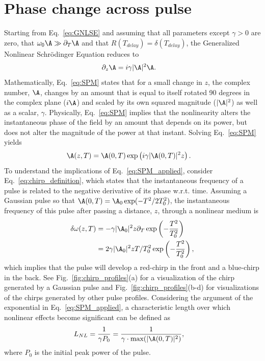 \section{Phase change across pulse}
Starting from Eq.~\ref{eq:GNLSE} and assuming that all parameters except $\gamma>0$ are zero, that $\omega_0\A\gg\partial_T\A$ and that $R(T_{delay})=\delta(T_{delay})$, the Generalized Nonlinear Schr{\"o}dinger Equation reduces to
\begin{align}
\label{eq:SPM}
    \partial_z\A &= i\gamma|\A|^2\A.
\end{align}
Mathematically, Eq.~\ref{eq:SPM} states that for a small change in $z$, the complex number, $\A$, changes by an amount that is equal to itself rotated 90 degrees in the complex plane ($i\A$) and scaled by its own squared magnitude ($|\A|^2$) as well as a scalar, $\gamma$. Physically, Eq.~\ref{eq:SPM} implies that the nonlinearity alters the instantaneous phase of the field by an amount that depends on its power, but does not alter the magnitude of the power at that instant. Solving Eq.~\ref{eq:SPM} yields
\begin{align}
    \label{eq:SPM_applied}
    \A(z,T)&= \A(0,T)\exp\left( i\gamma|\A(0,T)|^2z \right).
\end{align}
To understand the implications of Eq.~\ref{eq:SPM_applied}, consider Eq.~\ref{eq:chirp_definition}, which states that the instantaneous frequency of a pulse is related to the negative derivative of its phase w.r.t. time.  Assuming a Gaussian pulse so that $\A(0,T)=\A_0\exp(-T^2/2T_0^2)$, the instantaneous frequency of this pulse after passing a distance, $z$, through a nonlinear medium is
\begin{align}
\label{eq:SPM_example}
    \delta\omega(z,T) &= -\gamma |\A_0|^2 z\partial_T \exp\left(-\frac{T^2}{T_0^2}\right)\\ \nonumber
    &= 2\gamma |\A_0|^2 z T/T_0^2 \exp\left(-\frac{T^2}{T_0^2}\right),
\end{align}
which implies that the pulse will develop a red-chirp in the front and a blue-chirp in the back. See Fig.~\ref{fig:chirp_profiles}(a) for a visualization of the chirp generated by a Gaussian pulse and Fig.~\ref{fig:chirp_profiles}(b-d) for visualizations of the chirps generated by other pulse profiles. Considering the argument of the exponential in Eq.~\ref{eq:SPM_applied}, a characteristic length over which nonlinear effects become significant can be defined as
\begin{align}
    L_{NL} &= \frac{1}{\gamma P_0} = \frac{1}{\gamma\cdot\text{max}(|\A(0,T)|^2) },  
\end{align}
where $P_0$ is the initial peak power of the pulse. 

